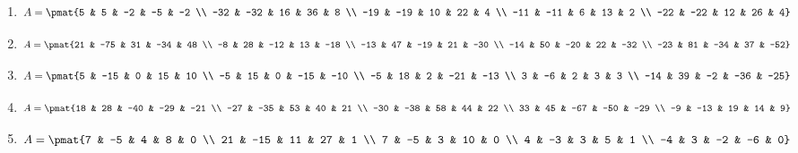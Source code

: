 \begin{enumerate}
\item

\begin{align*}
A = \pmat{5 & 5 & -2 & -5 & -2 \\ -32 & -32 & 16 & 36 & 8 \\ -19 & -19 & 10 & 22 & 4 \\ -11 & -11 & 6 & 13 & 2 \\ -22 & -22 & 12 & 26 & 4}
\end{align*}

\item

\begin{align*}
A = \pmat{21 & -75 & 31 & -34 & 48 \\ -8 & 28 & -12 & 13 & -18 \\ -13 & 47 & -19 & 21 & -30 \\ -14 & 50 & -20 & 22 & -32 \\ -23 & 81 & -34 & 37 & -52}
\end{align*}

\item

\begin{align*}
A = \pmat{5 & -15 & 0 & 15 & 10 \\ -5 & 15 & 0 & -15 & -10 \\ -5 & 18 & 2 & -21 & -13 \\ 3 & -6 & 2 & 3 & 3 \\ -14 & 39 & -2 & -36 & -25}
\end{align*}

\item

\begin{align*}
A = \pmat{18 & 28 & -40 & -29 & -21 \\ -27 & -35 & 53 & 40 & 21 \\ -30 & -38 & 58 & 44 & 22 \\ 33 & 45 & -67 & -50 & -29 \\ -9 & -13 & 19 & 14 & 9}
\end{align*}

\item

\begin{align*}
A = \pmat{7 & -5 & 4 & 8 & 0 \\ 21 & -15 & 11 & 27 & 1 \\ 7 & -5 & 3 & 10 & 0 \\ 4 & -3 & 3 & 5 & 1 \\ -4 & 3 & -2 & -6 & 0}
\end{align*}


\end{enumerate}
